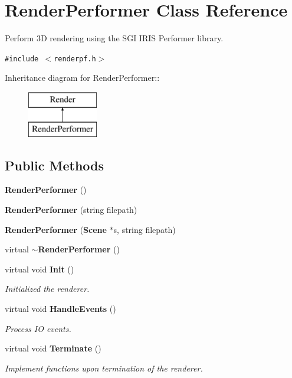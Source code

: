 \section{Render\-Performer  Class Reference}
\label{classRenderPerformer}
Perform 3D rendering using the SGI IRIS Performer library. 


{\tt \#include $<$renderpf.h$>$}

Inheritance diagram for Render\-Performer::\begin{figure}[H]
\begin{center}
\leavevmode
\includegraphics[height=2cm]{classRenderPerformer}
\end{center}
\end{figure}
\subsection*{Public Methods}
\begin{CompactItemize}
\item 
{\bf Render\-Performer} ()
\item 
{\bf Render\-Performer} (string filepath)
\item 
{\bf Render\-Performer} ({\bf Scene} $\ast$s, string filepath)
\item 
virtual {\bf $\sim$Render\-Performer} ()
\item 
virtual void {\bf Init} ()
\begin{CompactList}\small\item\em Initialized the renderer.\item\end{CompactList}\item 
virtual void {\bf Handle\-Events} ()
\begin{CompactList}\small\item\em Process IO events.\item\end{CompactList}\item 
virtual void {\bf Terminate} ()
\begin{CompactList}\small\item\em Implement functions upon termination of the renderer.\item\end{CompactList}\end{CompactItemize}
